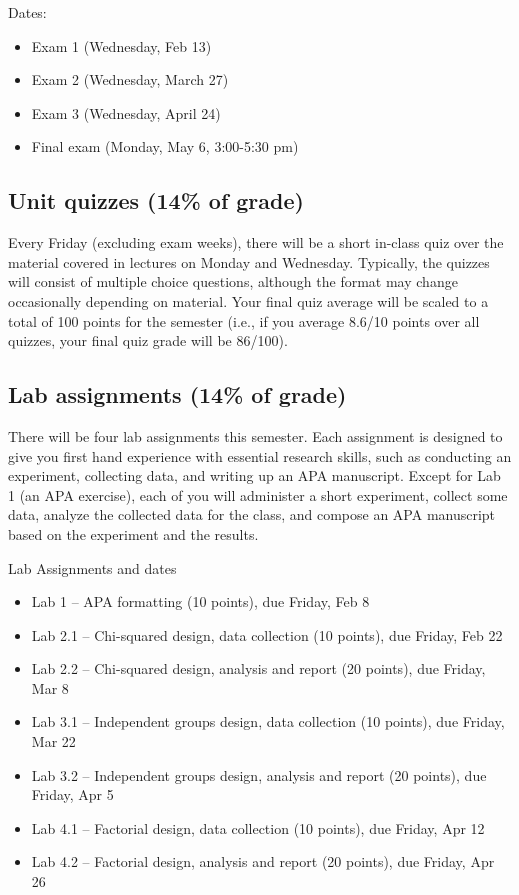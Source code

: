 \documentclass[10pt]{article}
\begin{document}
Dates:

\begin{itemize}
\item Exam 1 (Wednesday, Feb 13)
\item Exam 2 (Wednesday, March 27)
\item Exam 3 (Wednesday, April 24)
\item Final exam (Monday, May 6, 3:00-5:30 pm)
\end{itemize}

\subsection*{Unit quizzes (14\% of grade)}
\label{sec:orgf903fc9}

Every Friday (excluding exam weeks), there will be a short in-class quiz over the material covered in lectures on Monday and Wednesday. Typically, the quizzes will consist of multiple choice questions, although the format may change occasionally depending on material.  Your final quiz average will be scaled to a total of 100 points for the semester (i.e., if you average 8.6/10 points over all quizzes, your final quiz grade will be 86/100).

\subsection*{Lab assignments (14\% of grade)}
\label{sec:org11ea554}

There will be four lab assignments this semester.  Each assignment is designed to give you first hand experience with essential research skills, such as conducting an experiment, collecting data, and writing up an APA manuscript.  Except for Lab 1 (an APA exercise), each of you will administer a short experiment, collect some data, analyze the collected data for the class, and compose an APA manuscript based on the experiment and the results. 

Lab Assignments and dates

\begin{itemize}
\item Lab 1 – APA formatting (10 points), due Friday, Feb 8
\item Lab 2.1 – Chi-squared design, data collection (10 points), due Friday, Feb 22
\item Lab 2.2 – Chi-squared design, analysis and report (20 points), due Friday, Mar 8
\item Lab 3.1 – Independent groups design, data collection (10 points), due Friday, Mar 22
\item Lab 3.2 – Independent groups design, analysis and report (20 points), due Friday, Apr 5
\item Lab 4.1 – Factorial design, data collection (10 points), due Friday, Apr 12
\item Lab 4.2 – Factorial design, analysis and report (20 points), due Friday, Apr 26
\end{itemize}
\end{document}
